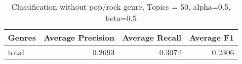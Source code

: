 \begin{table}[h]
\begin{tabular}{|l|r|r|r|}

\hline
\textbf{Genres} &  \textbf{Average Precision} & \textbf{Average Recall} & \textbf{Average F1} \\
\hline
total		&	0.2693 &	0.3074 &	0.2306\\
\hline
\end{tabular}
\caption{Classification without pop/rock genre, Topics = 50, alpha=0.5, beta=0.5}
\end{table}